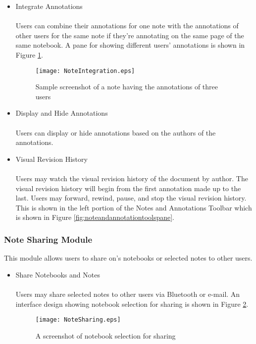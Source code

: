 \begin{itemize}
\item Integrate Annotations
\\\\Users can combine their annotations for one note with the annotations of other users for the same note if they're annotating on the same page of the same notebook. A pane for showing different users' annotations is shown in Figure \ref{fig:noteintegration}.

\begin{figure}[htbp!]
   \centering        
   \texttt{[image: NoteIntegration.eps]}
   \caption{Sample screenshot of a note having the annotations of three users}
   \label{fig:noteintegration}
\end{figure}

\item Display and Hide Annotations
\\\\Users can display or hide annotations based on the authors of the annotations.
\item Visual Revision History
\\\\Users may watch the visual revision history of the document by author. The visual revision history will begin from the first annotation made up to the last. Users may forward, rewind, pause, and stop the visual revision history. This is shown in the left portion of the Notes and Annotations Toolbar which is shown in Figure \ref{fig:noteandannotationtoolspane}.
\end{itemize}

\subsubsection{Note Sharing Module}
\label{sec:notesharingmodule}

This module allows users to share on's notebooks or selected notes to other users.

\begin{itemize}
\item Share Notebooks and Notes
\\\\Users may share selected notes to other users via Bluetooth or e-mail. An interface design showing notebook selection for sharing is shown in Figure \ref{fig:notesharing}.

\begin{figure}[htbp!]  
   \centering          
   \texttt{[image: NoteSharing.eps]}
   \caption{A screenshot of notebook selection for sharing}
   \label{fig:notesharing}
\end{figure}

\end{itemize}

